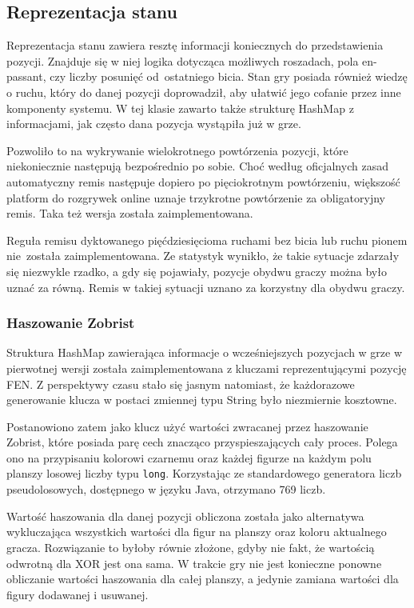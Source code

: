 \subsection{Reprezentacja stanu}
\label{subsec:reprezentacja-stanu}

Reprezentacja stanu zawiera resztę informacji koniecznych do przedstawienia pozycji.
Znajduje się w niej logika dotycząca możliwych roszadach, pola en-passant, czy liczby posunięć od~ostatniego bicia.
Stan gry posiada również wiedzę o ruchu, który do danej pozycji doprowadził, aby ułatwić jego cofanie przez inne komponenty systemu.
W tej klasie zawarto także strukturę HashMap z informacjami, jak często dana pozycja wystąpiła już w grze.

Pozwoliło to na wykrywanie wielokrotnego powtórzenia pozycji, które niekoniecznie następują bezpośrednio po sobie.
Choć według oficjalnych zasad automatyczny remis następuje dopiero po pięciokrotnym powtórzeniu, większość platform do rozgrywek online uznaje trzykrotne powtórzenie za obligatoryjny remis.
Taka też wersja została zaimplementowana.

Reguła remisu dyktowanego pięćdziesięcioma ruchami bez bicia lub ruchu pionem nie~została zaimplementowana.
Ze statystyk wynikło, że takie sytuacje zdarzały się niezwykle rzadko, a gdy się pojawiały, pozycje obydwu graczy można było uznać za równą.
Remis w takiej sytuacji uznano za korzystny dla obydwu graczy.

\subsubsection{Haszowanie Zobrist}
Struktura HashMap zawierająca informacje o wcześniejszych pozycjach w grze w pierwotnej wersji została zaimplementowana z kluczami reprezentującymi pozycję FEN.
Z perspektywy czasu stało się jasnym natomiast, że każdorazowe generowanie klucza w postaci zmiennej typu String było niezmiernie kosztowne.

Postanowiono zatem jako klucz użyć wartości zwracanej przez haszowanie Zobrist, które posiada parę cech znacząco przyspieszających cały proces.
Polega ono na przypisaniu kolorowi czarnemu oraz każdej figurze na każdym polu planszy losowej liczby typu \texttt{long}.
Korzystając ze standardowego generatora liczb pseudolosowych, dostępnego w języku Java, otrzymano 769 liczb.

Wartość haszowania dla danej pozycji obliczona została jako alternatywa wykluczająca wszystkich wartości dla figur na planszy oraz koloru aktualnego gracza.
Rozwiązanie to byłoby równie złożone, gdyby nie fakt, że wartością odwrotną dla XOR jest ona sama.
W trakcie gry nie jest konieczne ponowne obliczanie wartości haszowania dla całej planszy, a jedynie zamiana wartości dla figury dodawanej i usuwanej.

